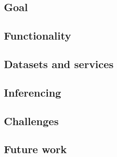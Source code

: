 \documentclass[12pt, a4paper, lithuanian]{article}
\begin{document}
\subsection{Goal}

\subsection{Functionality}

\subsection{Datasets and services}

\subsection{Inferencing}

\subsection{Challenges}

\subsection{Future work}
\end{document}
